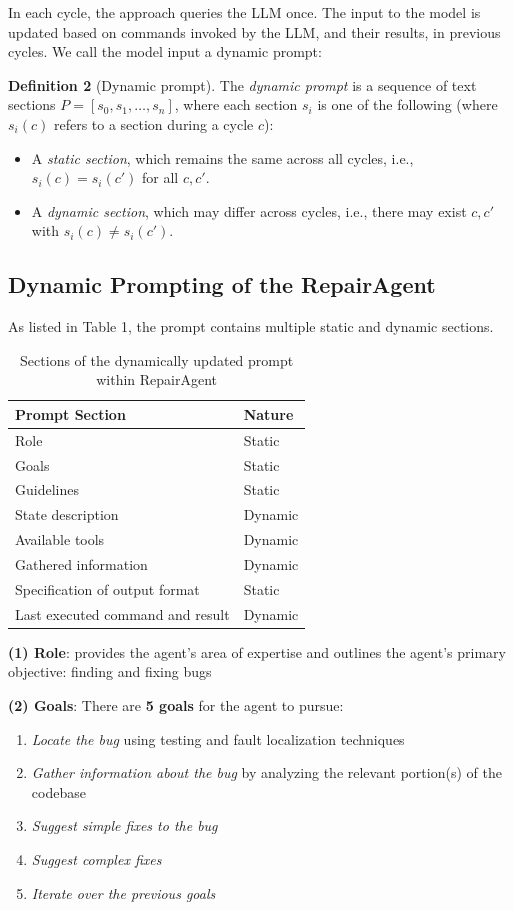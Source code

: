\documentclass[manuscript,review]{acmart}
\begin{document}
\noindent In each cycle, the approach queries the LLM once. The input to the model is updated based on commands invoked by the LLM, and their results, in previous cycles. We call the model input a dynamic prompt: 

\noindent \textbf{Definition 2} (Dynamic prompt). The \textit{dynamic prompt} is a sequence of text sections $P = [s_0, s_1, \dots, s_n]$, where each section $s_i$ is one of the following (where $s_i(c)$ refers to a section during a cycle $c$):
\begin{itemize}
    \item A \textit{static section}, which remains the same across all cycles, i.e., $s_i(c) = s_i(c')$ for all $c, c'$.
    \item A \textit{dynamic section}, which may differ across cycles, i.e., there may exist $c, c'$ with $s_i(c) \neq s_i(c')$.
\end{itemize}

\subsection{Dynamic Prompting of the RepairAgent}
As listed in Table 1, the prompt contains multiple static and dynamic sections.

\begin{table}[h]
\caption{Sections of the dynamically updated prompt within RepairAgent}
\label{tab:prompt_sections}
\centering
\begin{tabular}{ll}
\toprule
\textbf{Prompt Section} & \textbf{Nature} \\
\midrule
Role & Static \\
Goals & Static \\
Guidelines & Static \\
State description & Dynamic \\
Available tools & Dynamic \\
Gathered information & Dynamic \\
Specification of output format & Static \\
Last executed command and result & Dynamic \\
\bottomrule
\end{tabular}
\end{table}

\noindent \textbf{(1) Role}: provides the agent's area of expertise and outlines the agent's primary objective: finding and fixing bugs 

\noindent \textbf{(2) Goals}: There are \textbf{5 goals} for the agent to pursue:
\begin{enumerate}[label=\alph*)]
  \item \textit{Locate the bug} using testing and fault localization techniques
  \item \textit{Gather information about the bug} by analyzing the relevant portion(s) of the codebase
  \item \textit{Suggest simple fixes to the bug} 
  \item \textit{Suggest complex fixes} 
  \item \textit{Iterate over the previous goals}
\end{enumerate}
\end{document}
